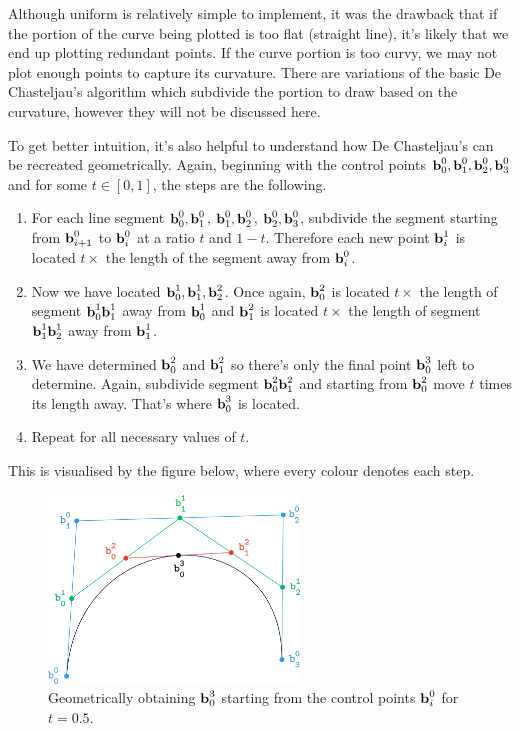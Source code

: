 \documentclass[a4paper]{article}
\begin{document}
Although uniform is relatively simple to implement, it was the drawback that if the portion of the curve being plotted is too flat (straight line), it's likely that we end up plotting redundant points. If the curve portion is too curvy, we may not plot enough points to capture its curvature. There are variations of the basic De Chasteljau's algorithm which subdivide the portion to draw based on the curvature, however they will not be discussed here.

To get better intuition, it's also helpful to understand how De Chasteljau's can be recreated geometrically. Again, beginning with the control points $\textbf{b}_0^0,\textbf{b}_1^0,\textbf{b}_2^0,\textbf{b}_3^0$ and for some $t\in[0,1]$, the steps are the following.
\begin{enumerate}
    \item For each line segment $\textbf{b}_0^0,\textbf{b}_1^0$, $\textbf{b}_1^0,\textbf{b}_2^0$, $\textbf{b}_2^0,\textbf{b}_3^0$, subdivide the segment starting from $\textbf{b}_{i+1}^0$ to $\textbf{b}_i^0$ at a ratio $t$ and $1-t$. Therefore each new point $\textbf{b}_i^1$ is located $t\times$ the length of the segment away from $\textbf{b}_{i}^0$.
    \item Now we have located $\textbf{b}_0^1,\textbf{b}_1^1, \textbf{b}_2^2$. Once again, $\textbf{b}_0^2$ is located $t\times$ the length of segment $\textbf{b}_0^1\textbf{b}_1^1$ away from $\textbf{b}_0^1$ and $\textbf{b}_1^2$ is located $t\times$ the length of segment $\textbf{b}_1^1\textbf{b}_2^1$ away from $\textbf{b}_1^1$.
    \item We have determined $\textbf{b}_0^2$ and $\textbf{b}_1^2$ so there's only the final point $\textbf{b}_0^3$ left to determine. Again, subdivide segment $\textbf{b}_0^2\textbf{b}_1^2$ and starting from $\textbf{b}_0^2$ move $t$ times its length away. That's where $\textbf{b}_0^3$ is located.
    \item Repeat for all necessary values of $t$.
\end{enumerate}

This is visualised by the figure below, where every colour denotes each step.

\begin{figure}[H]
    \centering
    \includegraphics[height=5cm]{img/bezier/casteljau_algo_bi.png}
    \caption{Geometrically obtaining $\textbf{b}_0^3$ starting from the control points $\textbf{b}_i^0$ for $t=0.5$.}%
\end{figure}
\end{document}
